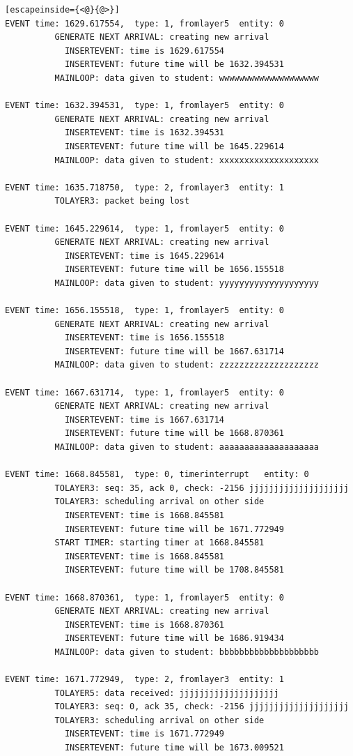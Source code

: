 \documentclass[paper=a4, fontsize=11pt]{scrartcl}
\numberwithin{equation}{section}		%
\numberwithin{figure}{section}			%
\numberwithin{table}{section}				%
\begin{document}
\begin{lstlisting}[escapeinside={<@}{@>}]
EVENT time: 1629.617554,  type: 1, fromlayer5  entity: 0
          GENERATE NEXT ARRIVAL: creating new arrival
            INSERTEVENT: time is 1629.617554
            INSERTEVENT: future time will be 1632.394531
          MAINLOOP: data given to student: wwwwwwwwwwwwwwwwwwww

EVENT time: 1632.394531,  type: 1, fromlayer5  entity: 0
          GENERATE NEXT ARRIVAL: creating new arrival
            INSERTEVENT: time is 1632.394531
            INSERTEVENT: future time will be 1645.229614
          MAINLOOP: data given to student: xxxxxxxxxxxxxxxxxxxx

EVENT time: 1635.718750,  type: 2, fromlayer3  entity: 1
          TOLAYER3: packet being lost

EVENT time: 1645.229614,  type: 1, fromlayer5  entity: 0
          GENERATE NEXT ARRIVAL: creating new arrival
            INSERTEVENT: time is 1645.229614
            INSERTEVENT: future time will be 1656.155518
          MAINLOOP: data given to student: yyyyyyyyyyyyyyyyyyyy

EVENT time: 1656.155518,  type: 1, fromlayer5  entity: 0
          GENERATE NEXT ARRIVAL: creating new arrival
            INSERTEVENT: time is 1656.155518
            INSERTEVENT: future time will be 1667.631714
          MAINLOOP: data given to student: zzzzzzzzzzzzzzzzzzzz

EVENT time: 1667.631714,  type: 1, fromlayer5  entity: 0
          GENERATE NEXT ARRIVAL: creating new arrival
            INSERTEVENT: time is 1667.631714
            INSERTEVENT: future time will be 1668.870361
          MAINLOOP: data given to student: aaaaaaaaaaaaaaaaaaaa

EVENT time: 1668.845581,  type: 0, timerinterrupt   entity: 0
          TOLAYER3: seq: 35, ack 0, check: -2156 jjjjjjjjjjjjjjjjjjjj
          TOLAYER3: scheduling arrival on other side
            INSERTEVENT: time is 1668.845581
            INSERTEVENT: future time will be 1671.772949
          START TIMER: starting timer at 1668.845581
            INSERTEVENT: time is 1668.845581
            INSERTEVENT: future time will be 1708.845581

EVENT time: 1668.870361,  type: 1, fromlayer5  entity: 0
          GENERATE NEXT ARRIVAL: creating new arrival
            INSERTEVENT: time is 1668.870361
            INSERTEVENT: future time will be 1686.919434
          MAINLOOP: data given to student: bbbbbbbbbbbbbbbbbbbb

EVENT time: 1671.772949,  type: 2, fromlayer3  entity: 1
          TOLAYER5: data received: jjjjjjjjjjjjjjjjjjjj
          TOLAYER3: seq: 0, ack 35, check: -2156 jjjjjjjjjjjjjjjjjjjj
          TOLAYER3: scheduling arrival on other side
            INSERTEVENT: time is 1671.772949
            INSERTEVENT: future time will be 1673.009521


\end{lstlisting}
\end{document}

